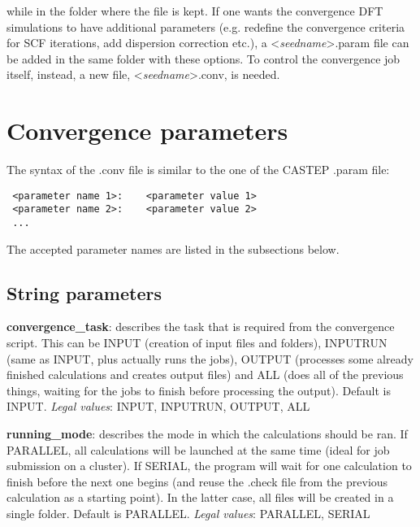 \documentclass[10pt]{article}
\begin{document}
while in the folder where the file is kept. If one wants the convergence DFT simulations to have additional parameters (e.g. redefine the convergence criteria for SCF iterations, add dispersion correction etc.), a \textless \textit{seedname}\textgreater.param file can be added in the same folder with these options. To control the convergence job itself, instead, a new file, \textless \textit{seedname}\textgreater.conv, is needed.

\section{Convergence parameters}

The syntax of the .conv file is similar to the one of the CASTEP .param file:

\begin{lstlisting}
 <parameter name 1>:    <parameter value 1>
 <parameter name 2>:    <parameter value 2>
 ...
\end{lstlisting}

The accepted parameter names are listed in the subsections below.

\subsection{String parameters}

\textbf{convergence\_task}: describes the task that is required from the convergence script. This can be INPUT (creation of input files and folders), INPUTRUN (same as INPUT, plus actually runs the jobs), OUTPUT (processes some already finished calculations and creates output files) and ALL (does all of the previous things, waiting for the jobs to finish before processing the output). Default is INPUT.\newline
\textit{Legal values}: INPUT, INPUTRUN, OUTPUT, ALL\newline

\textbf{running\_mode}: describes the mode in which the calculations should be ran. If PARALLEL, all calculations will be launched at the same time (ideal for job submission on a cluster). If SERIAL, the program will wait for one calculation to finish before the next one begins (and reuse the .check file from the previous calculation as a starting point). In the latter case, all files will be created in a single folder. Default is PARALLEL.\newline
\textit{Legal values}: PARALLEL, SERIAL\newline
\end{document}
